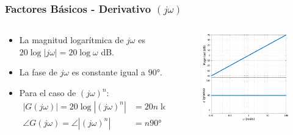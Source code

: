 \documentclass[aspectratio=169, handout]{beamer}
\theoremstyle{definition}
\theoremstyle{plain}
\theoremstyle{remark}
\begin{document}
\begin{frame}[<+->]\frametitle{Factores Básicos - Derivativo $(j\omega)$}
\begin{columns}
	\begin{column}{0.5\textwidth}
	\begin{itemize}
		\item La magnitud logarítmica de $j\omega$ es $20\log\left| j\omega \right| = 20 \log \omega$ dB.
		\item La fase de $j\omega$ es constante igual a $\ang{90}$.
		\item Para el caso de $(j\omega)^n$:
		\begin{align*}
		  \left| G(j\omega) \right| = 20 \log \left| (j\omega)^n \right| &= 20n\log\omega \text{ dB}\\
			\angle G(j\omega) = \angle \left| (j\omega)^n \right| &= n\ang{90}
		\end{align*}
	\end{itemize}
	\end{column}
	\begin{column}{0.5\textwidth}
		\begin{figure}
			\includegraphics[width=6.5cm]{images/bodeDerivative.eps}
		\end{figure}
	\end{column}
\end{columns}
\end{frame}
\end{document}
